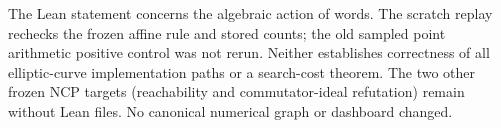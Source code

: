 \documentclass[10pt]{article}
\begin{document}
The Lean statement concerns the algebraic action of words. The scratch replay
rechecks the frozen affine rule and stored counts; the old sampled point
arithmetic positive control was not rerun. Neither establishes correctness of
all elliptic-curve implementation paths or a search-cost theorem. The two
other frozen NCP targets (reachability and commutator-ideal refutation) remain
without Lean files. No canonical numerical graph or dashboard changed.
\end{document}
